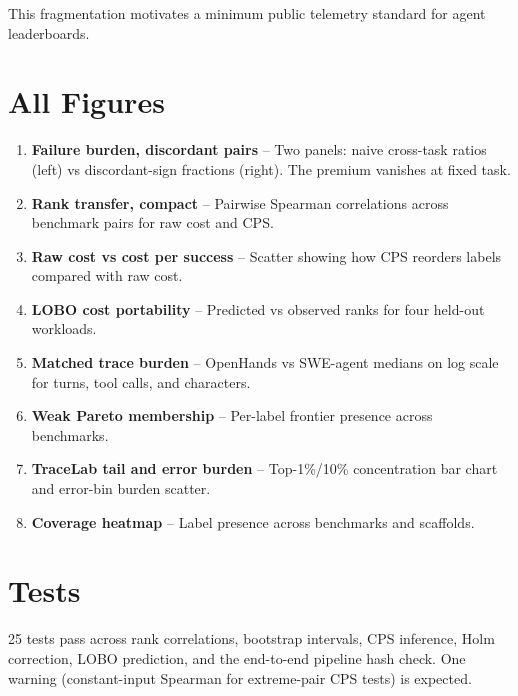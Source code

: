 \documentclass[11pt]{article}
\begin{document}
This fragmentation motivates a minimum public telemetry standard for agent
leaderboards.

\section{All Figures}

\begin{enumerate}[nosep]
\item \textbf{Failure burden, discordant pairs} -- Two panels: naive
  cross-task ratios (left) vs discordant-sign fractions (right). The premium
  vanishes at fixed task.

\item \textbf{Rank transfer, compact} -- Pairwise Spearman correlations across
  benchmark pairs for raw cost and CPS.

\item \textbf{Raw cost vs cost per success} -- Scatter showing how CPS
  reorders labels compared with raw cost.

\item \textbf{LOBO cost portability} -- Predicted vs observed ranks for four
  held-out workloads.

\item \textbf{Matched trace burden} -- OpenHands vs SWE-agent medians on log
  scale for turns, tool calls, and characters.

\item \textbf{Weak Pareto membership} -- Per-label frontier presence across
  benchmarks.

\item \textbf{TraceLab tail and error burden} -- Top-1\%/10\% concentration
  bar chart and error-bin burden scatter.

\item \textbf{Coverage heatmap} -- Label presence across benchmarks and
  scaffolds.
\end{enumerate}

\section{Tests}

25 tests pass across rank correlations, bootstrap intervals, CPS inference,
Holm correction, LOBO prediction, and the end-to-end pipeline hash check.
One warning (constant-input Spearman for extreme-pair CPS tests) is expected.
\end{document}
